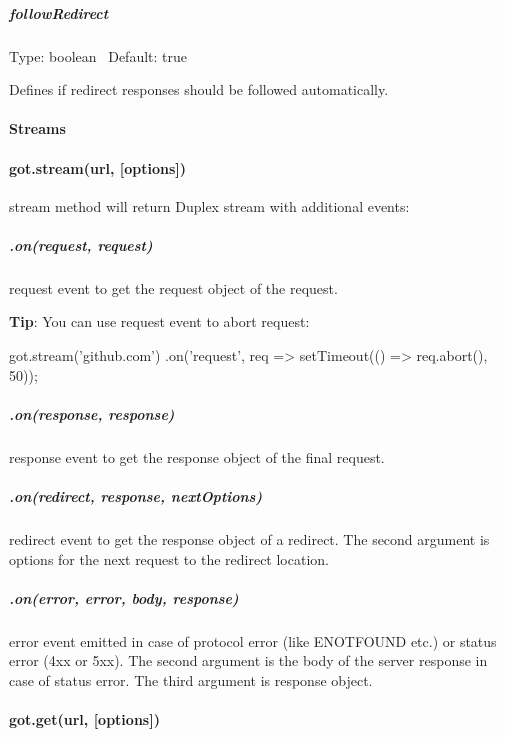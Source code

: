 \subparagraph*{follow\+Redirect}

Type\+: {\ttfamily boolean}~\newline
 Default\+: {\ttfamily true}

Defines if redirect responses should be followed automatically.

\paragraph*{Streams}

\paragraph*{got.\+stream(url, \mbox{[}options\mbox{]})}

{\ttfamily stream} method will return Duplex stream with additional events\+:

\subparagraph*{.on(\textquotesingle{}request\textquotesingle{}, request)}

{\ttfamily request} event to get the request object of the request.

{\bfseries Tip}\+: You can use {\ttfamily request} event to abort request\+:


\begin{DoxyCode}
got.stream('github.com')
  .on('request', req => setTimeout(() => req.abort(), 50));
\end{DoxyCode}


\subparagraph*{.on(\textquotesingle{}response\textquotesingle{}, response)}

{\ttfamily response} event to get the response object of the final request.

\subparagraph*{.on(\textquotesingle{}redirect\textquotesingle{}, response, next\+Options)}

{\ttfamily redirect} event to get the response object of a redirect. The second argument is options for the next request to the redirect location.

\subparagraph*{.on(\textquotesingle{}error\textquotesingle{}, error, body, response)}

{\ttfamily error} event emitted in case of protocol error (like {\ttfamily E\+N\+O\+T\+F\+O\+U\+ND} etc.) or status error (4xx or 5xx). The second argument is the body of the server response in case of status error. The third argument is response object.

\paragraph*{got.\+get(url, \mbox{[}options\mbox{]})}


